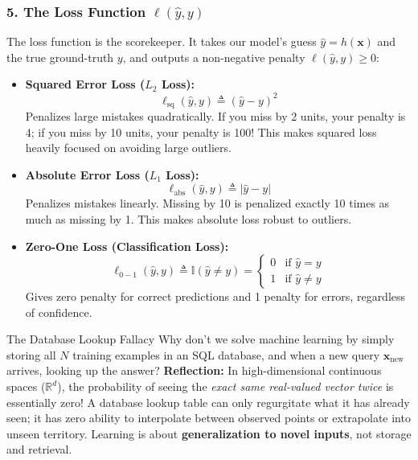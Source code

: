 \subsubsection{5. The Loss Function $\ell(\hat{y}, y)$}
The loss function is the scorekeeper. It takes our model's guess $\hat{y} = h(\mathbf{x})$ and the true ground-truth $y$, and outputs a non-negative penalty $\ell(\hat{y}, y) \ge 0$:
\begin{itemize}
    \item \textbf{Squared Error Loss ($L_2$ Loss):}
    \begin{equation}
    \ell_{\text{sq}}(\hat{y}, y) \triangleq (\hat{y} - y)^2
    \label{eq:l2_loss_def_ped}
    \end{equation}
    Penalizes large mistakes quadratically. If you miss by 2 units, your penalty is 4; if you miss by 10 units, your penalty is 100! This makes squared loss heavily focused on avoiding large outliers.
    \item \textbf{Absolute Error Loss ($L_1$ Loss):}
    \begin{equation}
    \ell_{\text{abs}}(\hat{y}, y) \triangleq |\hat{y} - y|
    \label{eq:l1_loss_def_ped}
    \end{equation}
    Penalizes mistakes linearly. Missing by 10 is penalized exactly 10 times as much as missing by 1. This makes absolute loss robust to outliers.
    \item \textbf{Zero-One Loss (Classification Loss):}
    \begin{equation}
    \ell_{0-1}(\hat{y}, y) \triangleq \mathbb{I}(\hat{y} \ne y) = \begin{cases} 0 & \text{if } \hat{y} = y \\ 1 & \text{if } \hat{y} \ne y \end{cases}
    \label{eq:zero_one_loss_def_ped}
    \end{equation}
    Gives zero penalty for correct predictions and 1 penalty for errors, regardless of confidence.
\end{itemize}

\begin{ponderbox}{The Database Lookup Fallacy}
Why don't we solve machine learning by simply storing all $N$ training examples in an SQL database, and when a new query $\mathbf{x}_{\text{new}}$ arrives, looking up the answer?
\tcblower
\textbf{Reflection:} In high-dimensional continuous spaces ($\mathbb{R}^d$), the probability of seeing the \emph{exact same real-valued vector twice} is essentially zero! A database lookup table can only regurgitate what it has already seen; it has zero ability to interpolate between observed points or extrapolate into unseen territory. Learning is about \textbf{generalization to novel inputs}, not storage and retrieval.
\end{ponderbox}

